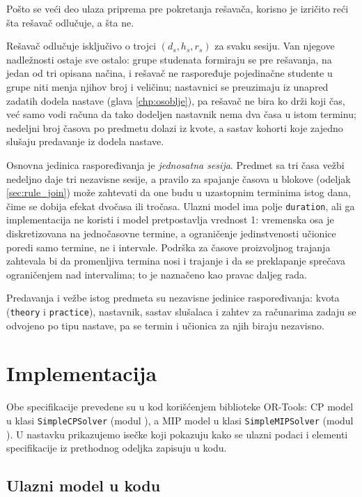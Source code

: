 \documentclass[12pt,oneside]{memoir}
\begin{document}
Pošto se veći deo ulaza priprema pre pokretanja rešavača, korisno je
izričito reći šta rešavač odlučuje, a šta ne.

Rešavač odlučuje isključivo o trojci $(d_s, h_s, r_s)$ za svaku
sesiju. Van njegove nadležnosti ostaje sve ostalo: grupe studenata
formiraju se pre rešavanja, na jedan od tri opisana načina, i rešavač
ne raspoređuje pojedinačne studente u grupe niti menja njihov broj i
veličinu; nastavnici se preuzimaju iz unapred zadatih dodela nastave
(glava \ref{chp:osoblje}), pa rešavač ne bira ko drži koji čas, već
samo vodi računa da tako dodeljen nastavnik nema dva časa u istom
terminu; nedeljni broj časova po predmetu dolazi iz kvote, a sastav
kohorti koje zajedno slušaju predavanje iz dodela nastave.

Osnovna jedinica raspoređivanja je \emph{jednosatna sesija}. Predmet
sa tri časa vežbi nedeljno daje tri nezavisne sesije, a pravilo za
spajanje časova u blokove (odeljak \ref{sec:rule_join}) može zahtevati
da one budu u uzastopnim terminima istog dana, čime se dobija efekat
dvočasa ili tročasa. Ulazni model ima polje \texttt{duration}, ali ga
implementacija ne koristi i model pretpostavlja vrednost 1: vremenska
osa je diskretizovana na jednočasovne termine, a ograničenje
jedinstvenosti učionice poredi samo termine, ne i intervale. Podrška
za časove proizvoljnog trajanja zahtevala bi da promenljiva termina
nosi i trajanje i da se preklapanje sprečava ograničenjem nad
intervalima; to je naznačeno kao pravac daljeg rada.

\label{sec:nezavisnost_tipova}
Predavanja i vežbe istog predmeta su nezavisne jedinice raspoređivanja:
kvota (\texttt{theory} i \texttt{practice}), nastavnik, sastav slušalaca
i zahtev za računarima zadaju se odvojeno po tipu nastave, pa se termin
i učionica za njih biraju nezavisno.

\section{Implementacija}
\label{sec:implementacija}

Obe specifikacije prevedene su u kod korišćenjem biblioteke OR-Tools:
CP model u klasi \texttt{SimpleCPSolver} (modul ),
a MIP model u klasi \texttt{SimpleMIPSolver} (modul
). U nastavku prikazujemo isečke koji pokazuju
kako se ulazni podaci i elementi specifikacije iz prethodnog odeljka
zapisuju u kodu.

\subsection{Ulazni model u kodu}
\end{document}
